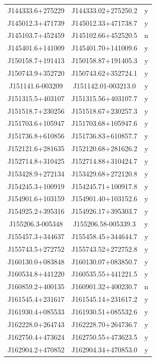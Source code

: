 \begin{table}
\begin{tabular}{ccc}
        J144333.6+275229 & J144333.02+275250.2 & y\\
        J145012.3+471739 & J145012.33+471738.7 & y\\
        J145103.7+452459 & J145102.66+452520.5 & n\\
        J145401.6+141009 & J145401.70+141009.6 & y\\
        J150158.7+191413 & J150158.87+191405.3 & y\\
        J150743.9+352720 & J150743.62+352724.1 & y\\
        J151141.6-003209 & J151142.01-003213.0 & y\\
        J151315.5+403107 & J151315.56+403107.7 & y\\
        J151518.7+230256 & J151518.67+230257.3 & y\\
        J151703.6+105947 & J151703.68+105947.6 & y\\
        J151736.8+610856 & J151736.83+610857.7 & y\\
        J152121.6+281635 & J152120.68+281626.2 & y\\
        J152714.8+310425 & J152714.88+310424.7 & y\\
        J153428.9+272134 & J153429.68+272120.8 & y\\
        J154245.3+100919 & J154245.71+100917.8 & y\\
        J154901.6+103159 & J154901.40+103152.6 & y\\
        J154925.2+395316 & J154926.17+395303.7 & y\\
        J155206.3-005348 & J155206.58-005339.3 & y\\
        J155457.3+344637 & J155458.45+344644.7 & y\\
        J155743.5+272752 & J155743.52+272752.8 & y\\
        J160130.0+083848 & J160130.07+083850.7 & y\\
        J160534.8+441220 & J160535.55+441221.5 & y\\
        J160859.2+400135 & J160901.32+400230.7 & n\\
        J161545.4+231617 & J161545.14+231617.2 & y\\
        J161930.4+085533 & J161930.51+085532.6 & y\\
        J162228.0+264743 & J162228.70+264736.7 & y\\
        J162750.4+473624 & J162750.55+473623.5 & y\\
        J162904.2+470852 & J162904.34+470853.0 & y\\

\end{tabular}
\end{table}
